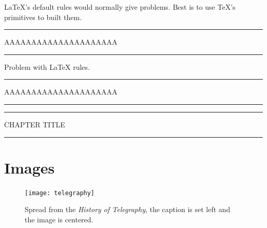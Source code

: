 
LaTeX's default rules would normally give problems. Best is to use TeX's primitives to built them.


\begin{texexample}{}{}
\makeatletter
\hrule width 5cm \p@
AAAAAAAAAAAAAAAAAAAAA
\vskip2.6pt\hrule width 5cm
\medskip

Problem with LaTeX rules.

\rule{5cm}{0.4pt}\par
AAAAAAAAAAAAAAAAAAAAA\par%
\rule[6.5pt]{5cm}{0.4pt}

\def\rule{\@ifnextchar[\@rule{\@rule[\z@]}}
\def\@rule[#1]#2#3{%
 \leavevmode
 \hbox{%
 \setlength\@tempdima{#1}%
 \setlength\@tempdimb{#2}%
 \setlength\@tempdimc{#3}%
 \advance\@tempdimc\@tempdima%
 \vrule\@width\@tempdimb\@height\@tempdimc\@depth-\@tempdima}}

\def\thickrule{\leavevmode \leaders \hrule height 3pt \hfill \kern \z@}

{\color{teal}\hrule width 10.5cm height3pt \p@
    {{\color{black!80}\HUGE CHAPTER TITLE}}\vskip3pt
\hrule width 10.5cm height3pt}
\makeatother
\end{texexample}


\section{Images}

\begin{figure}[htbp]
\centering
\texttt{[image: telegraphy]}
\caption{Spread from the \textit{History of Telegraphy}, the caption is set left and the image is centered.}
\end{figure}

